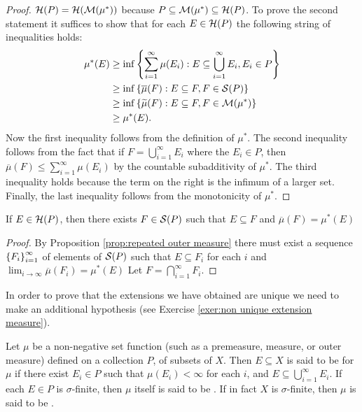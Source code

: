 \begin{proof}

${\cal H}(P)={\cal H}({\cal M}(\mu^*))$ because $P \subseteq {\cal M}(\mu^*) \subseteq {\cal H}(P)$. To prove the second statement it suffices to show that for each $E \in {\cal H}(P)$ the following string of inequalities holds:
\begin{align*}
    \mu^*(E) &\geq \inf\left\{\sum_{i=1}^\infty\mu(E_i):E\subseteq \bigcup_{i=1}^\infty E_i, E_i \in P\right\}\\
    &\geq \inf \left\{\overline{\mu}(F):E\subseteq F,F\in {\cal S}(P)\right\}\\
    &\geq \inf \left\{\widetilde{\mu}(F):E\subseteq F,F\in {\cal M}(\mu^*)\right\}\\
    &\geq \mu^*(E).
\end{align*}
Now the first inequality follows from the definition of $\mu^*$. The second inequality follows from the fact that if $F=\bigcup_{i=1}^\infty E_i$ where the $E_i \in P$, then $\overline{\mu}(F) \leq \sum_{i=1}^\infty \mu(E_i)$ by the countable subadditivity of $\mu^*$. The third inequality holds because the term on the right is the infimum of a larger set. Finally, the last inequality follows from the monotonicity of $\mu^*$.
\end{proof}

\begin{corollary}\label{cor:measure of hereditary wrt outer measure}
If $E \in {\cal H}(P)$, then there exists $F \in {\cal S}(P)$ such that $E \subseteq F$ and $\overline{\mu}(F)=\mu^*(E)$
\end{corollary}
\begin{proof}
By Proposition \ref{prop:repeated outer measure} there must exist a sequence $\left\{F_i\right\}_{i=1}^\infty$ of elements of ${\cal S}(P)$ such that $E \subseteq F_i$ for each $i$ and $\lim _{i \to \infty} \overline{\mu}(F_i)=\mu^*(E)$ Let $F=\bigcap_{i=1}^\infty F_i$.
\end{proof}

In order to prove that the extensions we have obtained are unique we need to make an additional hypothesis (see Exercise \ref{exer:non unique extension measure}).

\begin{definition}
Let $\mu$ be a non-negative set function (such as a premeasure, measure, or outer measure) defined on a collection $P$, of subsets of $X$. Then $E\subseteq X$ is said to be  for $\mu$ if there exist $E_i\in P$ such that $\mu(E_i)<\infty$ for each $i$, and $E\subseteq\bigcup_{i=1}^\infty E_i$. If each $E \in P$ is $\sigma$-finite, then $\mu$ itself is said to be . If in fact $X$ is $\sigma$-finite, then $\mu$ is said to be .
\end{definition}

